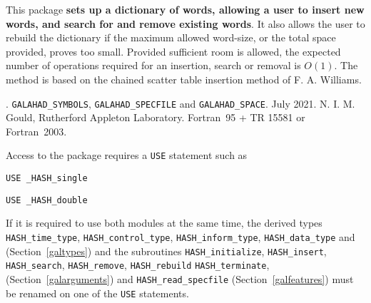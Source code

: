 \documentclass{galahad}
\newcommand{\packagename}{HASH}
\newcommand{\fullpackagename}{\libraryname\_\packagename}
\begin{document}
\galheader


\galsummary
This package {\bf sets up a dictionary of words, allowing a user to insert new
words, and search for and remove existing words}.  It also allows the user
to rebuild the dictionary if the maximum allowed word-size, or the
total space provided, proves too small.  Provided sufficient room is
allowed, the expected number of operations required for an insertion,
search or removal is $O(1)$.  The method is based on the chained
scatter table insertion method of F. A. Williams.


\galattributes
\galversions{\tt  \fullpackagename\_single, \fullpackagename\_double}.
\galuses
{\tt GALAHAD\_SY\-M\-BOLS},
{\tt GALAHAD\-\_SPECFILE}
and
{\tt GALAHAD\_SPACE}.
\galdate July 2021.
\galorigin N. I. M. Gould, Rutherford Appleton Laboratory.
\gallanguage Fortran~95 + TR 15581 or Fortran~2003.


\galhowto


Access to the package requires a {\tt USE} statement such as

\medskip{}

\hspace{8mm} {\tt USE \fullpackagename\_single}

\medskip{}

\hspace{8mm} {\tt USE  \fullpackagename\_double}

\medskip

\noindent
If it is required to use both modules at the same time, the derived types
{\tt \packagename\_time\_\-type},
{\tt \packagename\_control\_type},
{\tt \packagename\_inform\_type},
{\tt \packagename\_data\_type}
and
(Section~\ref{galtypes})
and the subroutines
{\tt \packagename\_initialize},
{\tt \packagename\_insert},
{\tt \packagename\-\_search},
{\tt \packagename\_remove},
{\tt \packagename\_rebuild}
{\tt \packagename\_terminate},
(Section~\ref{galarguments})
and
{\tt \packagename\_read\_specfile}
(Section~\ref{galfeatures})
must be renamed on one of the {\tt USE} statements.
\end{document}
